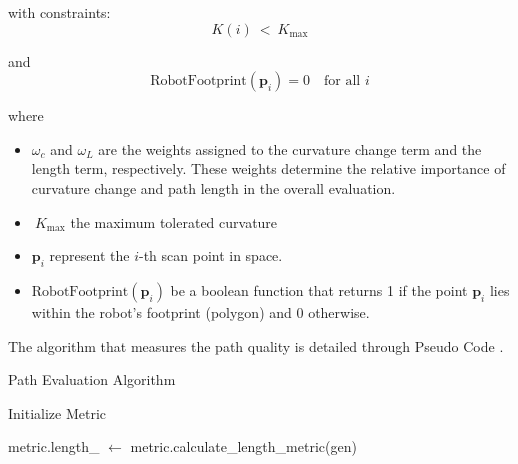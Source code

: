 \noindent
with constraints: \[K(i)\ <\ K_{\max}\]
\noindent

and \[\text{RobotFootprint}(\mathbf{p}_i) = 0 \quad \text{for all } i\]


where \begin{itemize}
    \item \(\omega_c\) and \(\omega_L\) are the weights assigned to the curvature change term and the length term, 
    respectively. These weights determine the relative importance of curvature change and path length in the overall 
    evaluation. 
    \item \(\ K_{\max}\) the maximum tolerated curvature
    \item \( \mathbf{p}_i \) represent the \( i \)-th scan point in space. 

    \item \( \text{RobotFootprint}(\mathbf{p}_i) \) be a boolean function that returns 1 if the point \( \mathbf{p}_i \) 
    lies within the robot's footprint (polygon) and 0 otherwise.
    
\end{itemize}

The algorithm that measures the path quality is detailed through Pseudo Code .

\begin{algorithm}[H]
    \caption{Path Evaluation Algorithm}\label{EvaluationAlgorithm}

    \SetAlgoLined
    
    Initialize Metric\;
    
    
    metric.length\_ $\gets$ metric.calculate\_length\_metric(gen)\;
    
    
    \;
\end{algorithm}

\newpage

